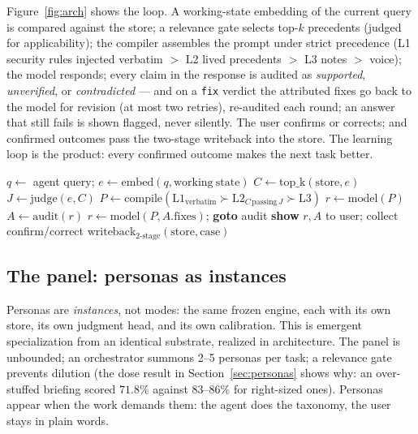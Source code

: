 \documentclass[11pt]{article}
\begin{document}
Figure~\ref{fig:arch} shows the loop. A working-state embedding of the current query is compared against the store; a relevance gate selects top-$k$ precedents (judged for applicability); the compiler assembles the prompt under strict precedence (L1 security rules injected verbatim $>$ L2 lived precedents $>$ L3 notes $>$ voice); the model responds; every claim in the response is audited as \emph{supported}, \emph{unverified}, or \emph{contradicted} --- and on a \texttt{fix} verdict the attributed fixes go back to the model for revision (at most two retries), re-audited each round; an answer that still fails is shown flagged, never silently. The user confirms or corrects; and confirmed outcomes pass the two-stage writeback into the store. The learning loop is the product: every confirmed outcome makes the next task better.

\begin{algorithm}[htbp]
\caption{The Persona layer loop (the full design; Table~\ref{tab:active} lists which parts ran in each experiment)}
\label{alg:loop}
\begin{algorithmic}[1]
\State $q \gets$ agent query; $e \gets \mathrm{embed}(q, \mathrm{working\ state})$
\State $C \gets \mathrm{top\_k}(\mathrm{store}, e)$ 
\State $J \gets \mathrm{judge}(e, C)$ 
\State $P \gets \mathrm{compile}(\mathrm{L1}_{\mathrm{verbatim}} \succ \mathrm{L2}_{C \,\mathrm{passing}\, J} \succ \mathrm{L3})$
\State $r \gets \mathrm{model}(P)$
\State $A \gets \mathrm{audit}(r)$ 
  \State $r \gets \mathrm{model}(P, A.\mathrm{fixes})$; \textbf{goto} audit 
\EndIf
\State \textbf{show} $r, A$ to user; collect confirm/correct
  \State $\mathrm{writeback}_{2\text{-stage}}(\mathrm{store}, \mathrm{case})$ 
\EndIf
\end{algorithmic}
\end{algorithm}

\subsection{The panel: personas as instances}
Personas are \emph{instances}, not modes: the same frozen engine, each with its own store, its own judgment head, and its own calibration. This is emergent specialization from an identical substrate, realized in architecture. The panel is unbounded; an orchestrator summons 2--5 personas per task; a relevance gate prevents dilution (the dose result in Section~\ref{sec:personas} shows why: an over-stuffed briefing scored $71.8\%$ against $83$--$86\%$ for right-sized ones). Personas appear when the work demands them: the agent does the taxonomy, the user stays in plain words.
\end{document}
